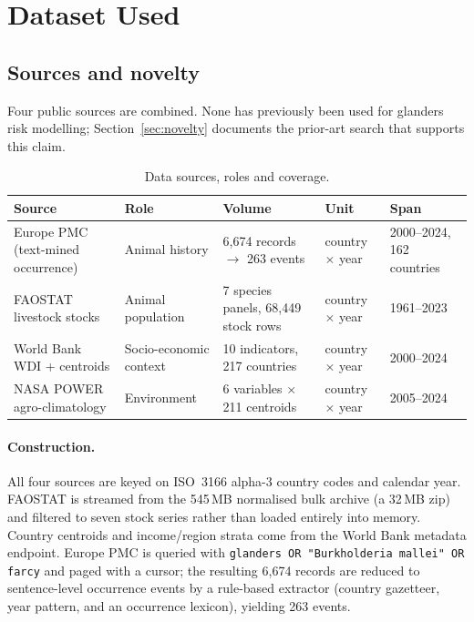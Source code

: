\documentclass[11pt]{article}
\begin{document}
\section{Dataset Used}

\subsection{Sources and novelty}

Four public sources are combined. None has previously been used for glanders risk modelling;
Section~\ref{sec:novelty} documents the prior-art search that supports this claim.

\begin{table}[H]
\centering
\caption{Data sources, roles and coverage.}
\label{tab:sources}
\small
\begin{tabular}{@{}p{3.9cm}p{2.3cm}p{3.4cm}p{2.0cm}p{2.6cm}@{}}
\toprule
\textbf{Source} & \textbf{Role} & \textbf{Volume} & \textbf{Unit} & \textbf{Span} \\
\midrule
Europe PMC (text-mined occurrence) & Animal history & 6,674 records $\rightarrow$ 263 events & country $\times$ year & 2000--2024, 162 countries \\
FAOSTAT livestock stocks & Animal population & 7 species panels, 68,449 stock rows & country $\times$ year & 1961--2023 \\
World Bank WDI + centroids & Socio-economic context & 10 indicators, 217 countries & country $\times$ year & 2000--2024 \\
NASA POWER agro-climatology & Environment & 6 variables $\times$ 211 centroids & country $\times$ year & 2005--2024 \\
\bottomrule
\end{tabular}
\end{table}

\paragraph{Construction.} All four sources are keyed on ISO~3166 alpha-3 country codes and
calendar year. FAOSTAT is streamed from the 545\,MB normalised bulk archive (a 32\,MB zip) and
filtered to seven stock series rather than loaded entirely into memory. Country centroids and
income/region strata come from the World Bank metadata endpoint. Europe PMC is queried with
\texttt{glanders OR "Burkholderia mallei" OR farcy} and paged with a cursor; the resulting
6,674 records are reduced to sentence-level occurrence events by a rule-based extractor
(country gazetteer, year pattern, and an occurrence lexicon), yielding 263 events.
\end{document}
